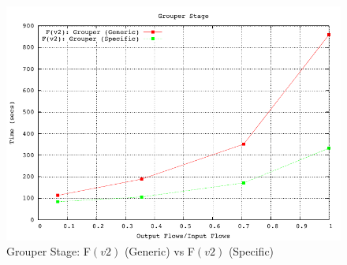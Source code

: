 \begin{figure}[h!]
  \begin{center}
    \includegraphics*
    [width=0.8\linewidth]{figures/benchmarks/grouper-fv2-bsearch-fv2}
    \caption{Grouper Stage: F$(v2)$ (Generic) vs F$(v2)$ (Specific)}
    \label{fig:fv1-fv2-grouper}
  \end{center}
\end{figure}

